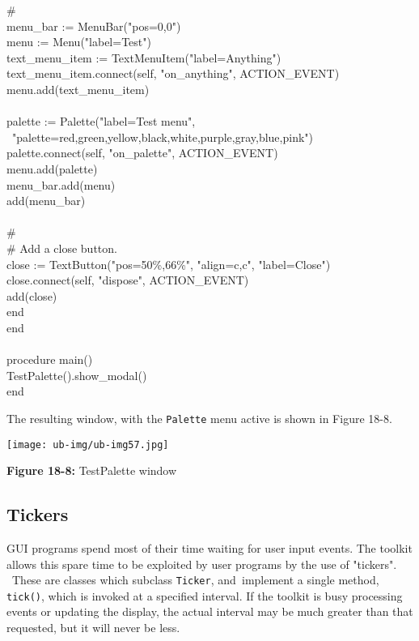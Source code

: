 {\>\>\# \\
\>\>menu\_bar := MenuBar("pos=0,0") \\
\>\>menu := Menu("label=Test") \\
\>\>text\_menu\_item := TextMenuItem("label=Anything") \\
\>\>text\_menu\_item.connect(self, "on\_anything", ACTION\_EVENT) \\
\>\>menu.add(text\_menu\_item) \\
\ \\
\>\>palette := Palette("label=Test menu", \\
\>\>\>\>\>\>\>\ "palette=red,green,yellow,black,white,purple,gray,blue,pink") \\
\>\>palette.connect(self, "on\_palette", ACTION\_EVENT) \\
\>\>menu.add(palette) \\
\>\>menu\_bar.add(menu) \\
\>\>add(menu\_bar) \\
\ \\
\>\>\# \\
\>\>\# Add a close button.\\
\>\>close := TextButton("pos=50\%,66\%", "align=c,c", "label=Close") \\
\>\>close.connect(self, "dispose", ACTION\_EVENT) \\
\>\>add(close) \\
\>end \\
end \\
\ \\
procedure main() \\
\>TestPalette().show\_modal() \\
end
}

\bigskip

The resulting window, with the \texttt{Palette} menu active is shown in
Figure 18-8.

\begin{center}
\texttt{[image: ub-img/ub-img57.jpg]}
\end{center}

{\sffamily\bfseries Figure 18-8:}
{\sffamily TestPalette window}

\subsection{Tickers}

GUI programs spend most of their time waiting for user input
events. The toolkit allows this spare time to be exploited by user
programs by the use of "tickers". \ These
are classes which subclass \texttt{Ticker}, and\texttt{ }implement a
single method, \texttt{tick()}, which is invoked at a specified
interval. If the toolkit is busy processing events or
updating the display, the actual interval may be much greater than that
requested, but it will never be less.

